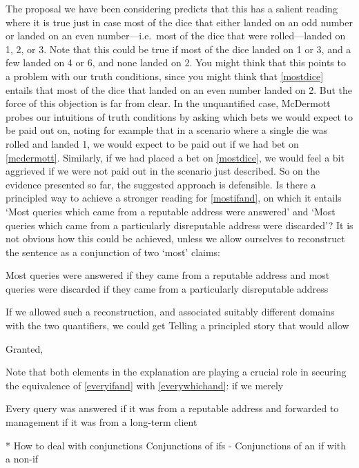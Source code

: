 \documentclass[If.tex]{subfiles}
\begin{document}
The proposal we have been considering predicts that this has a salient reading where it is true just in case most of the dice that either landed on an odd number or landed on an even number---i.e.\ most of the dice that were rolled---landed on 1, 2, or 3.  Note that this could be true if most of the dice landed on 1 or 3, and a few landed on 4 or 6, and none landed on 2.  You might think that this points to a problem with our truth conditions, since you might think that \ref{mostdice} entails that most of the dice that landed on an even number landed on 2.  But the force of this objection is far from clear. In the unquantified case, McDermott probes our intuitions of truth conditions by asking which bets we would expect to be paid out on, noting for example that in a scenario where a single die was rolled and landed 1, we would expect to be paid out if we had bet on \ref{mcdermott}.  Similarly, if we had placed a bet on \ref{mostdice}, we would feel a bit aggrieved if we were not paid out in the scenario just described. So on the evidence presented so far, the suggested approach is defensible.  Is there a principled way to achieve a stronger reading for \ref{mostifand}, on which it entails ‘Most queries which came from a reputable address were answered’ and ‘Most queries which came from a particularly disreputable address were discarded’?  It is not obvious how this could be achieved, unless we allow ourselves to reconstruct the sentence as a conjunction of two ‘most’ claims:
\begin{prop}
	\nitem
	Most queries were answered if they came from a reputable address and most queries were discarded if they came from a particularly disreputable address
\end{prop}
If we allowed such a reconstruction, and associated suitably different domains with the two quantifiers, we could get 
Telling a principled story that would allow 


Granted, 



Note that both elements in the explanation are playing a crucial role in securing the equivalence of \ref{everyifand} with \ref{everywhichand}: if we merely 

\begin{prop}
	\nitem
	Every query was answered if it was from a reputable address and forwarded to management if it was from a long-term client
\end{prop}




* How to deal with conjunctions
	Conjunctions of ifs - 
	Conjunctions of an if with a non-if
	
\end{document}
